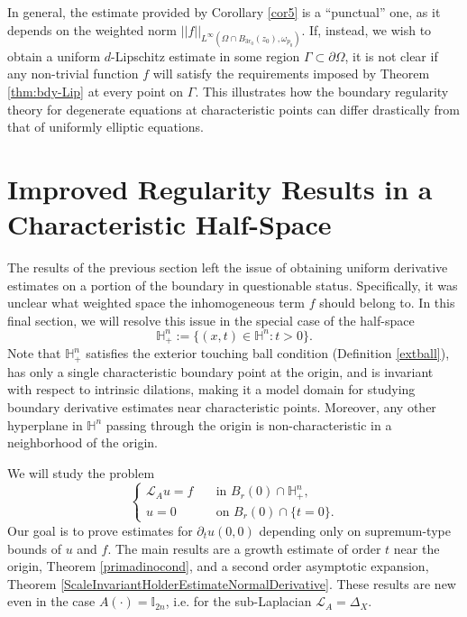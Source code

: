 \documentclass[12pt]{amsart}
\newcommand{\Lop}{\mathcal{L}}
\def \H {{\mathbb H}}
\def \O {\Omega}
\begin{document}
In general, the estimate provided by Corollary \ref{cor5} is a ``punctual'' one, as it depends on the weighted norm $||f||_{L^{\infty}(\O\cap B_{3r_0}(z_0),\omega_{p_0})}$. If, instead, we wish to obtain a uniform $d$-Lipschitz estimate in some region $\Gamma \subset \partial \O$, it is not clear if any non-trivial function $f$ will satisfy the requirements imposed by Theorem \ref{thm:bdy-Lip} at every point on $\Gamma$. This illustrates how the boundary regularity theory for degenerate equations at characteristic points can differ drastically from that of uniformly elliptic equations.

\section{Improved Regularity Results in a Characteristic Half-Space}\label{sec:halfspace}

The results of the previous section left the issue of obtaining uniform derivative estimates on a portion of the boundary in questionable status. Specifically, it was unclear what weighted space the inhomogeneous term $f$ should belong to. In this final section, we will resolve this issue in the special case of the half-space
$$\H^n_+:=\{(x,t) \in \H^n : t > 0 \}.$$ 
Note that $\H^n_+$ satisfies the exterior touching ball condition (Definition \ref{extball}), has only a single characteristic boundary point at the origin, and is invariant with respect to intrinsic dilations, making it a model domain for studying boundary derivative estimates near characteristic points. Moreover, any other hyperplane in $\H^n$ passing through the origin is non-characteristic in a neighborhood of the origin. 

We will study the problem
\begin{equation}\label{half-space-BVP}
\begin{cases}
\Lop_A u = f & \quad \text{in } B_r(0)\cap \H^n_+, \\
u= 0 & \quad \text{on }  B_r(0)\cap\{t=0\}.
\end{cases}
\end{equation}
Our goal is to prove estimates for $\partial_t u(0,0)$ depending only on supremum-type bounds of $u$ and $f$. The main results are a growth estimate of order $t$ near the origin, Theorem \ref{primadinocond}, and a second order asymptotic expansion, Theorem \ref{ScaleInvariantHolderEstimateNormalDerivative}. These results are new even in the case $A(\cdot)=\mathbb{I}_{2n}$, i.e. for the sub-Laplacian $\Lop_A=\Delta_X$.
\end{document}
